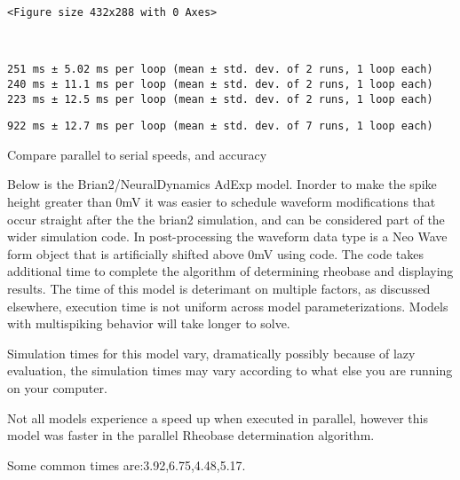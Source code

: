    
    \begin{verbatim}
<Figure size 432x288 with 0 Axes>
    \end{verbatim}

    
    \begin{center}
    \end{center}
    { \hspace*{\fill} \\}
    
    \begin{Verbatim}[commandchars=\\\{\}]
251 ms ± 5.02 ms per loop (mean ± std. dev. of 2 runs, 1 loop each)
240 ms ± 11.1 ms per loop (mean ± std. dev. of 2 runs, 1 loop each)
223 ms ± 12.5 ms per loop (mean ± std. dev. of 2 runs, 1 loop each)
    \end{Verbatim}

    \begin{Verbatim}[commandchars=\\\{\}]
922 ms ± 12.7 ms per loop (mean ± std. dev. of 7 runs, 1 loop each)
    \end{Verbatim}

    Compare parallel to serial speeds, and accuracy

    Below is the Brian2/NeuralDynamics AdExp model. Inorder to make the
spike height greater than 0mV it was easier to schedule waveform
modifications that occur straight after the the brian2 simulation, and
can be considered part of the wider simulation code. In post-processing
the waveform data type is a Neo Wave form object that is artificially
shifted above 0mV using code. The code takes additional time to complete
the algorithm of determining rheobase and displaying results. The time
of this model is deterimant on multiple factors, as discussed elsewhere,
execution time is not uniform across model parameterizations. Models
with multispiking behavior will take longer to solve.

Simulation times for this model vary, dramatically possibly because of
lazy evaluation, the simulation times may vary according to what else
you are running on your computer.

Not all models experience a speed up when executed in parallel, however
this model was faster in the parallel Rheobase determination algorithm.

Some common times are:3.92,6.75,4.48,5.17.


